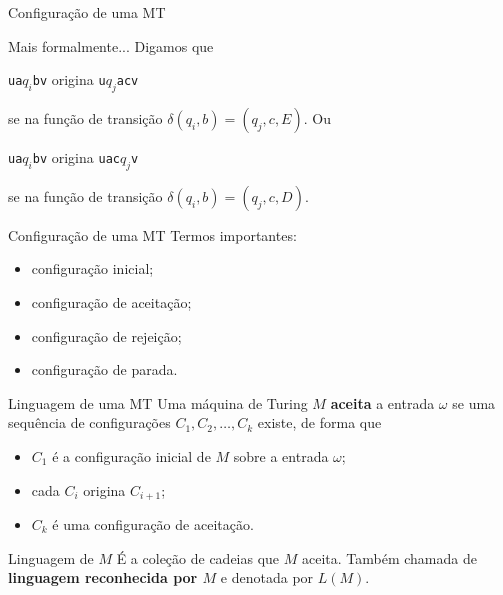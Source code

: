 \documentclass[xcolor=dvipsnames,table]{beamer}
\begin{document}
	\begin{frame}{Configuração de uma MT}
		\begin{block}{Mais formalmente...}
			Digamos que 
			\begin{center}
				{\tt ua}$q_i${\tt bv} origina {\tt u}$q_j${\tt acv} 
			\end{center} 
			se na função de transição $\delta(q_i, b) = (q_j, c, E)$. Ou
			\begin{center}
				{\tt ua}$q_i${\tt bv} origina {\tt uac}$q_j${\tt v} 
			\end{center} 
			se na função de transição $\delta(q_i, b) = (q_j, c, D)$.
		\end{block}
	\end{frame}
	
	\begin{frame}{Configuração de uma MT}
		Termos importantes:
		\begin{itemize}
			\item configuração inicial;
			\item configuração de aceitação;
			\item configuração de rejeição;
			\item configuração de parada.
		\end{itemize}
	\end{frame}
	
	\begin{frame}{Linguagem de uma MT}
		Uma máquina de Turing $M$ {\bf aceita} a entrada $\omega$ se uma sequência de configurações $C_1, C_2, \ldots, C_k$ existe, de forma que 
		\begin{itemize}
			\item $C_1$ é a configuração inicial de $M$ sobre a entrada $\omega$;
			\item cada $C_i$ origina $C_{i+1}$;
			\item $C_k$ é uma configuração de aceitação.
		\end{itemize} \pause
		
		\begin{block}{Linguagem de $M$}
			É a coleção de cadeias que $M$ aceita. Também chamada de {\bf linguagem reconhecida por $M$} e denotada por $L(M)$.
		\end{block}		
	\end{frame}
	
	\begin{frame}
		\titlepage
	\end{frame}
	
\end{document}

